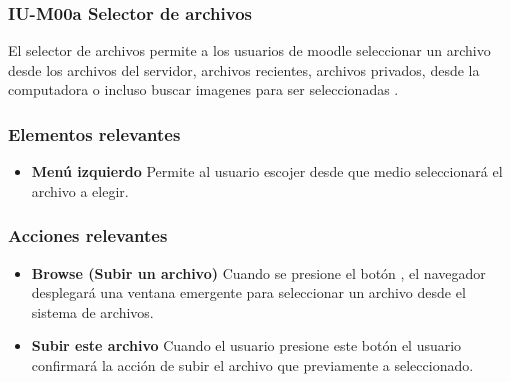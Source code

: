 
\subsubsection{IU-M00a Selector de archivos}

 El selector de archivos permite a los usuarios de moodle seleccionar un archivo desde los archivos
 del servidor, archivos recientes, archivos privados, desde la computadora o incluso buscar imagenes
 para ser seleccionadas \cite{MoodleSelectorArchivos}.


\subsubsection{Elementos relevantes}

    \begin{itemize}
    \item {\bf Menú izquierdo}
        Permite al usuario escojer desde que medio seleccionará el archivo a elegir.
    \end{itemize}

\subsubsection{Acciones relevantes}

    \begin{itemize}
    \item {\bf Browse (Subir un archivo)}
        Cuando se presione el botón , el navegador desplegará una ventana
        emergente para seleccionar un archivo desde el sistema de archivos.

    \item {\bf Subir este archivo}
        Cuando el usuario presione este botón el usuario confirmará la acción de subir
        el archivo que previamente a seleccionado.
    \end{itemize}
